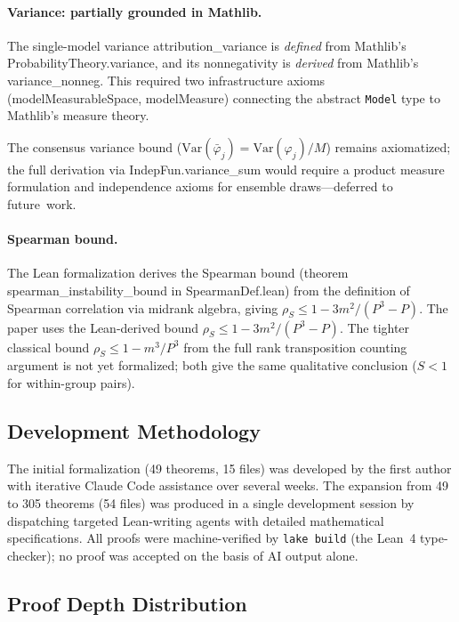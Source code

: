 \documentclass{jmlr}
\newcommand{\Var}{\mathrm{Var}}
\begin{document}
\paragraph{Variance: partially grounded in Mathlib.}
\begin{sloppypar}
The single-model variance \textsf{attribution\_variance} is \emph{defined} from
Mathlib's \textsf{ProbabilityTheory.variance}, and its nonnegativity is \emph{derived} from Mathlib's \textsf{variance\_nonneg}.
This required two infrastructure axioms (\textsf{modelMeasurableSpace}, \textsf{modelMeasure}) connecting the abstract \texttt{Model} type to Mathlib's measure theory.
\end{sloppypar}

The consensus variance bound ($\Var(\bar\varphi_j) = \Var(\varphi_j)/M$) remains axiomatized; the full derivation via \textsf{IndepFun.variance\_sum} would require a product measure formulation and independence axioms for ensemble draws---deferred to future~work.

\paragraph{Spearman bound.}
The Lean formalization derives the Spearman bound (theorem \textsf{spearman\_instability\_bound} in \textsf{SpearmanDef.lean}) from the definition of Spearman correlation via midrank algebra, giving
$\rho_S \leq 1 - 3m^2/(P^3{-}P)$.
The paper uses the Lean-derived bound $\rho_S \leq 1 - 3m^2/(P^3{-}P)$. The tighter classical bound $\rho_S \leq 1 - m^3/P^3$ from the full rank transposition counting argument is not yet formalized; both give the same qualitative conclusion ($S < 1$ for within-group pairs).

\subsection{Development Methodology}

The initial formalization (49 theorems, 15 files) was developed by the first author with iterative Claude Code assistance over several weeks. The expansion from 49 to 305 theorems (54 files) was produced in a single development session by dispatching targeted Lean-writing agents with detailed mathematical specifications. All proofs were machine-verified by \texttt{lake build} (the Lean~4 type-checker); no proof was accepted on the basis of AI output alone.

\subsection{Proof Depth Distribution}
\end{document}
